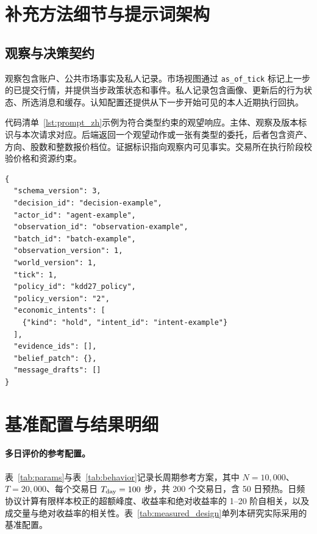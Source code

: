 \appendix
\section{补充方法细节与提示词架构}
\label{sec:appendix_zh}

\subsection{观察与决策契约}
\label{app:prompt_zh}

观察包含账户、公共市场事实及私人记录。市场视图通过 \texttt{as\_of\_tick} 标记上一步的已提交行情，并提供当步政策状态和事件。私人记录包含画像、更新后的行为状态、所选消息和缓存。认知配置还提供从下一步开始可见的本人近期执行回执。

代码清单~\ref{lst:prompt_zh}示例为符合类型约束的观望响应。主体、观察及版本标识与本次请求对应。后端返回一个观望动作或一张有类型的委托，后者包含资产、方向、股数和整数报价档位。证据标识指向观察内可见事实。交易所在执行阶段校验价格和资源约束。

\noindent\begin{minipage}{\columnwidth}
\begin{lstlisting}[caption={观望动作响应示例。}, label={lst:prompt_zh}, basicstyle=\ttfamily\scriptsize, breaklines=true, frame=single, aboveskip=3pt, belowskip=3pt]
{
  "schema_version": 3,
  "decision_id": "decision-example",
  "actor_id": "agent-example",
  "observation_id": "observation-example",
  "batch_id": "batch-example",
  "observation_version": 1,
  "world_version": 1,
  "tick": 1,
  "policy_id": "kdd27_policy",
  "policy_version": "2",
  "economic_intents": [
    {"kind": "hold", "intent_id": "intent-example"}
  ],
  "evidence_ids": [],
  "belief_patch": {},
  "message_drafts": []
}
\end{lstlisting}
\end{minipage}

\section{基准配置与结果明细}
\label{app:benchmark_details_zh}

\paragraph{多日评价的参考配置。}
表~\ref{tab:params}与表~\ref{tab:behavior}记录长周期参考方案，其中 $N=10{,}000$、$T=20{,}000$、每个交易日 $T_{\rm day}=100$ 步，共 200 个交易日，含 50 日预热。日频协议计算有限样本校正的超额峰度、收益率和绝对收益率的 1--20 阶自相关，以及成交量与绝对收益率的相关性。表~\ref{tab:measured_design}单列本研究实际采用的基准配置。

